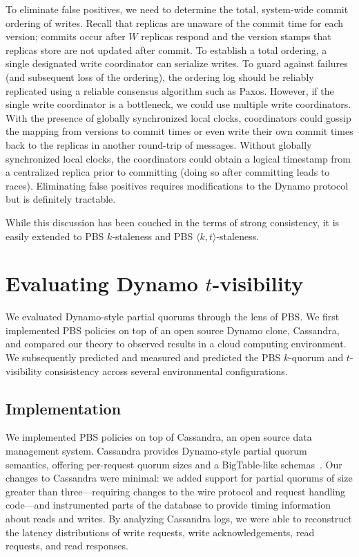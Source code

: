 \documentclass{vldb}
\begin{document}
To eliminate false positives, we need to determine the total,
system-wide commit ordering of writes. Recall that replicas are
unaware of the commit time for each version; commits occur after $W$
replicas respond and the version stamps that replicas store are not
updated after commit.  To establish a total ordering, a single
designated write coordinator can serialize writes.  To guard against
failures (and subsequent loss of the ordering), the ordering log
should be reliably replicated using a reliable consensus algorithm
such as Paxos.  However, if the single write coordinator is a
bottleneck, we could use multiple write coordinators.  With the
presence of globally synchronized local clocks, coordinators could
gossip the mapping from versions to commit times or even write their
own commit times back to the replicas in another round-trip of
messages.  Without globally synchronized local clocks, the
coordinators could obtain a logical timestamp from a centralized
replica prior to committing (doing so after committing leads to
races).  Eliminating false positives requires modifications to the
Dynamo protocol but is definitely tractable.

While this discussion has been couched in the terms of strong
consistency, it is easily extended to PBS $k$-staleness and PBS
$\langle k, t \rangle$-staleness.

\section{Evaluating Dynamo $t$-visibility}
\label{sec:dynamoeval}

We evaluated Dynamo-style partial quorums through the lens of PBS.  We
first implemented PBS policies on top of an open source Dynamo clone,
Cassandra, and compared our theory to observed results in a cloud
computing environment.  We subsequently predicted and measured and
predicted the PBS $k$-quorum and $t$-visibility consisistency across
several environmental configurations.

\subsection{Implementation}

We implemented PBS policies on top of Cassandra, an open source data
management system.  Cassandra provides Dynamo-style partial quorum
semantics, offering per-request quorum sizes and a BigTable-like
schemas~\cite{needed}.  Our changes to Cassandra were minimal: we
added support for partial quorums of size greater than
three---requiring changes to the wire protocol and request handling
code---and instrumented parts of the database to provide timing
information about reads and writes.  By analyzing Cassandra logs, we
were able to reconstruct the latency distributions of write requests,
write acknowledgements, read requests, and read responses.
\end{document}
